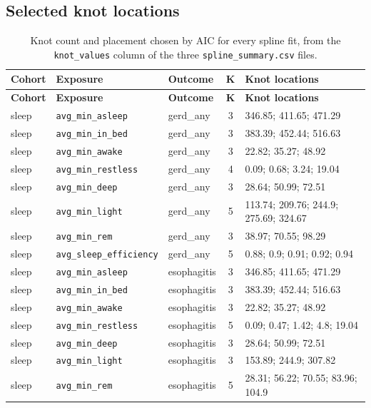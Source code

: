 \documentclass[11pt]{article}
\newcommand{\code}[1]{\texttt{\small #1}}
\begin{document}
\subsection{Selected knot locations}
\footnotesize\begin{longtable}{@{}p{1.7cm}p{3.2cm}p{2.0cm}c p{5.4cm}@{}}
\caption{Knot count and placement chosen by AIC for every spline fit, from the \code{knot\_values} column of the three \code{spline\_summary.csv} files.}\label{tab:appM-knots}\\
\toprule \textbf{Cohort} & \textbf{Exposure} & \textbf{Outcome} & \textbf{K} & \textbf{Knot locations} \\ \midrule \endfirsthead
\toprule \textbf{Cohort} & \textbf{Exposure} & \textbf{Outcome} & \textbf{K} & \textbf{Knot locations} \\ \midrule \endhead
sleep & \code{avg\_min\_asleep} & gerd\_any & 3 & 346.85; 411.65; 471.29 \\
sleep & \code{avg\_min\_in\_bed} & gerd\_any & 3 & 383.39; 452.44; 516.63 \\
sleep & \code{avg\_min\_awake} & gerd\_any & 3 & 22.82; 35.27; 48.92 \\
sleep & \code{avg\_min\_restless} & gerd\_any & 4 & 0.09; 0.68; 3.24; 19.04 \\
sleep & \code{avg\_min\_deep} & gerd\_any & 3 & 28.64; 50.99; 72.51 \\
sleep & \code{avg\_min\_light} & gerd\_any & 5 & 113.74; 209.76; 244.9; 275.69; 324.67 \\
sleep & \code{avg\_min\_rem} & gerd\_any & 3 & 38.97; 70.55; 98.29 \\
sleep & \code{avg\_sleep\_efficiency} & gerd\_any & 5 & 0.88; 0.9; 0.91; 0.92; 0.94 \\
sleep & \code{avg\_min\_asleep} & esophagitis & 3 & 346.85; 411.65; 471.29 \\
sleep & \code{avg\_min\_in\_bed} & esophagitis & 3 & 383.39; 452.44; 516.63 \\
sleep & \code{avg\_min\_awake} & esophagitis & 3 & 22.82; 35.27; 48.92 \\
sleep & \code{avg\_min\_restless} & esophagitis & 5 & 0.09; 0.47; 1.42; 4.8; 19.04 \\
sleep & \code{avg\_min\_deep} & esophagitis & 3 & 28.64; 50.99; 72.51 \\
sleep & \code{avg\_min\_light} & esophagitis & 3 & 153.89; 244.9; 307.82 \\
sleep & \code{avg\_min\_rem} & esophagitis & 5 & 28.31; 56.22; 70.55; 83.96; 104.9 \\

\end{longtable}
\end{document}

